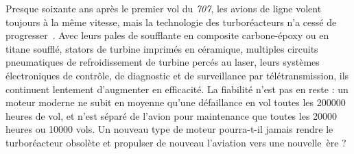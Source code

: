 Presque soixante ans après le premier vol du \textit{707}, les avions de ligne volent toujours à la même vitesse, mais la technologie des turboréacteurs n’a cessé de progresser~\cite{rollsroyce2005}. Avec leurs pales de soufflante en composite carbone-époxy ou en titane soufflé, stators de turbine imprimés en céramique, multiples circuits pneumatiques de refroidissement de turbine percés au laser, leurs systèmes électroniques de contrôle, de diagnostic et de surveillance par télétransmission, ils continuent lentement d’augmenter en efficacité. La fiabilité n’est pas en reste : un moteur moderne ne subit en moyenne qu’une défaillance en vol toutes les \num{200 000} heures de vol, et n’est séparé de l’avion pour maintenance que toutes les \num{20 000} heures ou \num{10 000} vols. Un nouveau type de moteur pourra-t-il jamais rendre le turboréacteur obsolète et propulser de nouveau l’aviation vers une nouvelle~ère ?

\atendofhistorysection
